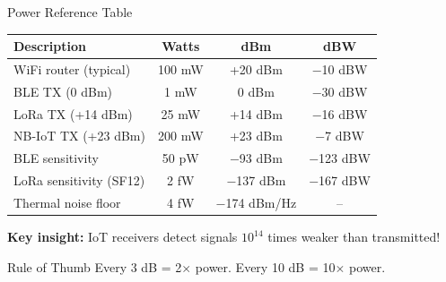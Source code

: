 \documentclass[aspectratio=169,11pt]{beamer}
\begin{document}
\begin{frame}{Power Reference Table}
    \begin{table}
        \centering
        \begin{tabular}{@{}lccc@{}}
            \toprule
            \textbf{Description} & \textbf{Watts} & \textbf{dBm} & \textbf{dBW} \\
            \midrule
            WiFi router (typical) & 100 mW & +20 dBm & $-$10 dBW \\
            BLE TX (0 dBm) & 1 mW & 0 dBm & $-$30 dBW \\
            LoRa TX (+14 dBm) & 25 mW & +14 dBm & $-$16 dBW \\
            NB-IoT TX (+23 dBm) & 200 mW & +23 dBm & $-$7 dBW \\
            \midrule
            BLE sensitivity & 50 pW & $-$93 dBm & $-$123 dBW \\
            LoRa sensitivity (SF12) & 2 fW & $-$137 dBm & $-$167 dBW \\
            Thermal noise floor & 4 fW & $-$174 dBm/Hz & -- \\
            \bottomrule
        \end{tabular}
    \end{table}
    
    \vspace{0.3cm}
    \textbf{Key insight:} IoT receivers detect signals $10^{14}$ times weaker than transmitted!
    
    \vspace{0.2cm}
    \begin{block}{Rule of Thumb}
        Every 3 dB = 2$\times$ power. Every 10 dB = 10$\times$ power.
    \end{block}
\end{frame}
\end{document}
